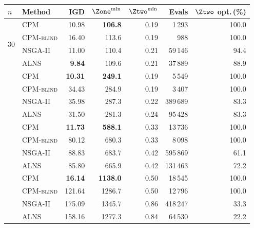 \begin{tabular}{@{}llrrrrr@{}}
\toprule
$n$ & Method & IGD & $\Zone^{\min}$ & $\Ztwo^{\min}$ & Evals & $\Ztwo$ opt.\,(\%) \\
\midrule
\multirow{4}{*}{30} & \textsc{CPM} & 10.98 & \textbf{106.8} & 0.19 & 1\,293 & 100.0 \\
 & \textsc{CPM-blind} & 16.40 & 113.6 & 0.19 & 988 & 100.0 \\
 & \textsc{NSGA-II} & 11.00 & 110.4 & 0.21 & 59\,146 & 94.4 \\
 & \textsc{ALNS} & \textbf{9.84} & 109.6 & 0.21 & 37\,889 & 88.9 \\
\addlinespace[1pt]
\multirow{4}{*}{60} & \textsc{CPM} & \textbf{10.31} & \textbf{249.1} & 0.19 & 5\,549 & 100.0 \\
 & \textsc{CPM-blind} & 34.43 & 284.9 & 0.19 & 3\,407 & 100.0 \\
 & \textsc{NSGA-II} & 35.98 & 287.3 & 0.22 & 389\,689 & 83.3 \\
 & \textsc{ALNS} & 31.50 & 281.3 & 0.24 & 95\,428 & 83.3 \\
\addlinespace[1pt]
\multirow{4}{*}{100} & \textsc{CPM} & \textbf{11.73} & \textbf{588.1} & 0.33 & 13\,736 & 100.0 \\
 & \textsc{CPM-blind} & 80.12 & 680.3 & 0.33 & 8\,098 & 100.0 \\
 & \textsc{NSGA-II} & 88.83 & 683.7 & 0.42 & 595\,869 & 61.1 \\
 & \textsc{ALNS} & 85.80 & 665.9 & 0.42 & 131\,463 & 72.2 \\
\addlinespace[1pt]
\multirow{4}{*}{150} & \textsc{CPM} & \textbf{16.14} & \textbf{1138.0} & 0.50 & 18\,545 & 100.0 \\
 & \textsc{CPM-blind} & 121.64 & 1286.7 & 0.50 & 12\,796 & 100.0 \\
 & \textsc{NSGA-II} & 175.09 & 1345.7 & 0.86 & 418\,247 & 33.3 \\
 & \textsc{ALNS} & 158.16 & 1277.3 & 0.84 & 64\,530 & 22.2 \\
\bottomrule
\end{tabular}
